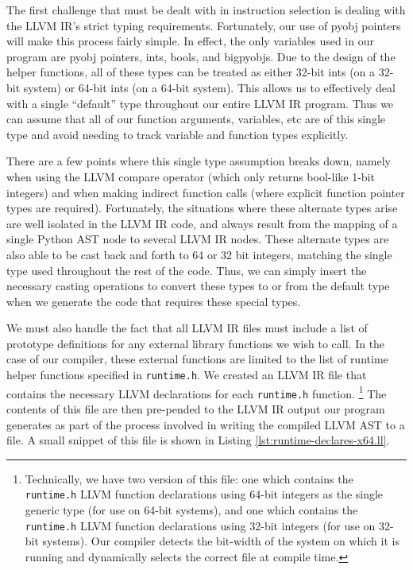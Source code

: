 \documentclass[11pt,twocolumn]{article}
\begin{document}

The first challenge that must be dealt with in instruction selection
is dealing with the LLVM IR's strict typing requirements. Fortunately,
our use of pyobj pointers will make this process fairly simple. In
effect, the only variables used in our program are pyobj pointers,
ints, bools, and bigpyobjs. Due to the design of the helper functions,
all of these types can be treated as either 32-bit ints (on a 32-bit
system) or 64-bit ints (on a 64-bit system). This allows us to
effectively deal with a single ``default'' type throughout our entire
LLVM IR program. Thus we can assume that all of our function
arguments, variables, etc are of this single type and avoid needing to
track variable and function types explicitly.

There are a few points where this single type assumption breaks down,
namely when using the LLVM compare operator (which only returns
bool-like 1-bit integers) and when making indirect function calls
(where explicit function pointer types are required). Fortunately, the
situations where these alternate types arise are well isolated in the
LLVM IR code, and always result from the mapping of a single Python
AST node to several LLVM IR nodes. These alternate types are also able
to be cast back and forth to 64 or 32 bit integers, matching the
single type used throughout the rest of the code. Thus, we can simply
insert the necessary casting operations to convert these types to or
from the default type when we generate the code that requires these
special types. 


We must also handle the fact that all LLVM IR files must include a
list of prototype definitions for any external library functions we
wish to call. In the case of our compiler, these external functions
are limited to the list of runtime helper functions specified in
\texttt{runtime.h}. We created an LLVM IR file that contains the
necessary LLVM declarations for each \texttt{runtime.h} function.
\footnote{Technically, we have two version
  of this file: one which contains the \texttt{runtime.h} LLVM
  function declarations using 64-bit integers as the single generic
  type (for use on 64-bit systems), and one which contains the
  \texttt{runtime.h} LLVM function declarations using 32-bit integers
  (for use on 32-bit systems). Our compiler detects the bit-width of
  the system on which it is running and dynamically selects the correct
  file at compile time.}
The contents of this file are then
pre-pended to the LLVM IR output our program generates as part of
the process involved in writing the compiled LLVM AST to a file. A
small snippet of this file is shown in Listing
\ref{lst:runtime-declares-x64.ll}.
\end{document}
